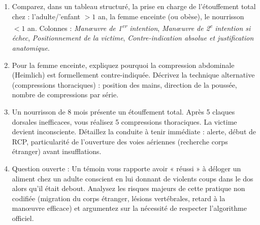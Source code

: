 \documentclass[11pt]{article}
\begin{document}
\begin{exercice}
\begin{enumerate}
    \item Comparez, dans un tableau structuré, la prise en charge de l'étouffement total chez : l'adulte/'enfant $> 1$ an, la femme enceinte (ou obèse), le nourrisson $< 1$ an. Colonnes : \textit{Manœuvre de 1\textsuperscript{er} intention}, \textit{Manœuvre de 2\textsuperscript{e} intention si échec}, \textit{Positionnement de la victime}, \textit{Contre-indication absolue et justification anatomique}.
    \item Pour la femme enceinte, expliquez pourquoi la compression abdominale (Heimlich) est formellement contre-indiquée. Décrivez la technique alternative (compressions thoraciques) : position des mains, direction de la poussée, nombre de compressions par série.
    \item Un nourrisson de 8 mois présente un étouffement total. Après 5 claques dorsales inefficaces, vous réalisez 5 compressions thoraciques. La victime devient inconsciente. Détaillez la conduite à tenir immédiate : alerte, début de RCP, particularité de l'ouverture des voies aériennes (recherche corps étranger) avant insufflations.
    \item Question ouverte : Un témoin vous rapporte avoir « réussi » à déloger un aliment chez un adulte conscient en lui donnant de violents coups dans le dos alors qu'il était debout. Analysez les risques majeurs de cette pratique non codifiée (migration du corps étranger, lésions vertébrales, retard à la manœuvre efficace) et argumentez sur la nécessité de respecter l'algorithme officiel.
\end{enumerate}
\end{exercice}
\end{document}
